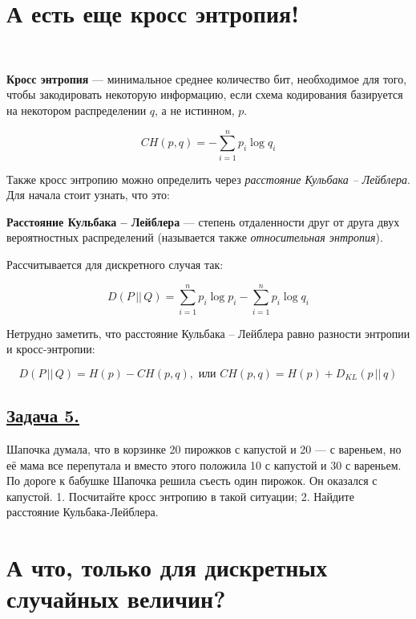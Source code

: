 \section*{А есть еще кросс энтропия!}~\
\\

\begin{siderules}
    \textbf{Кросс энтропия} --- минимальное среднее количество бит, необходимое для того, чтобы закодировать некоторую информацию, если схема кодирования базируется на некотором распределении $q$, а не истинном, $p$.
\end{siderules}

\[CH(p, q)=-\sum\limits_{i=1}^{n}p_i\log q_i \]

Также кросс энтропию можно определить через \textit{расстояние Кульбака -- Лейблера}. Для начала стоит узнать, что это:

\begin{siderules}
    \textbf{Расстояние Кульбака -- Лейблера} --- степень отдаленности друг от друга двух вероятностных распределений (называется также \textit{относительная энтропия}). \end{siderules}
    
    Рассчитывается для дискретного случая так:

    \[D(P\, ||\, Q)=\sum\limits_{i=1}^n p_i\log p_i-\sum\limits_{i=1}^n p_i\log q_i\]

Нетрудно заметить, что расстояние Кульбака -- Лейблера равно разности энтропии и кросс-энтропии:

\[D(P\, ||\, Q)=H(p)-CH(p,q), \text{ или } CH(p, q)=H(p)+D_{KL}(p\, || \, q)\]

\subsection*{\hyperref[sec:sol_problem5]{Задача 5.}}\label{sec:problem5} Шапочка думала, что в корзинке 20 пирожков с капустой и 20 — с вареньем, но её мама все перепутала и вместо этого положила 10 с капустой и 30 с вареньем. По дороге к бабушке Шапочка решила съесть один пирожок. Он оказался с капустой. 
1.	Посчитайте кросс энтропию в такой ситуации;
2.	Найдите расстояние Кульбака-Лейблера.

\section*{А что, только для дискретных случайных величин?}~\
\\

